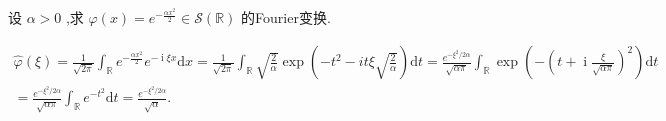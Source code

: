 \documentclass[lang=cn,newtx,10pt,scheme=chinese,thmcnt=chapter]{elegantbook}
\newcommand{\dif}{\mathrm{d}}
\newcommand{\ci}{\operatorname{i}}
\begin{document}
\begin{example}
  设 \(\alpha  > 0\) ,求 \(\varphi \left( x\right)  = {e}^{-\frac{\alpha {x}^{2}}{2}} \in  \mathcal{S}\left( \mathbb{R}\right)\) 的Fourier变换.
\end{example}
\begin{solution}
\begin{equation*}
  \begin{aligned}
\widehat{\varphi }\left( \xi \right)  = \frac{1}{\sqrt{2\pi }}{\int }_{\mathbb{R}}{e}^{-\frac{\alpha {x}^{2}}{2}}{e}^{-{\ci\xi x}}{\dif x}
= \frac{1}{\sqrt{2\pi }}{\int }_{\mathbb{R}}\sqrt{\frac{2}{\alpha }}\exp \left( {-{t}^{2} - {it\xi }\sqrt{\frac{2}{\alpha }}}\right) {\dif t}
= \frac{{e}^{-{\xi }^{2}/{2\alpha }}}{\sqrt{\alpha \pi }}{\int }_{\mathbb{R}}\exp \left( {-{\left( t + \ci\frac{\xi }{\sqrt{\alpha \pi }}\right) }^{2}}\right) {\dif t}\\
= \frac{{e}^{-{\xi }^{2}/{2\alpha }}}{\sqrt{\alpha \pi }}{\int }_{\mathbb{R}}{e}^{-{t}^{2}}{\dif t}
= \frac{{e}^{-{\xi }^{2}/{2\alpha }}}{\sqrt{\alpha }}.
  \end{aligned}
\end{equation*}

\end{solution}
\end{document}
